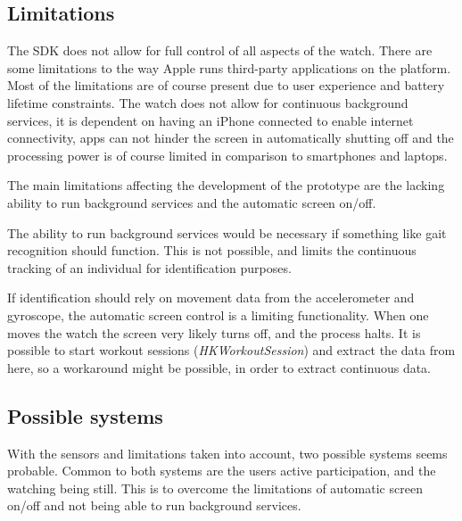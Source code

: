 \subsection{Limitations}
The SDK does not allow for full control of all aspects of the watch. There are
some limitations to the way Apple runs third-party applications on the platform.
Most of the limitations are of course present due to user experience and battery
lifetime constraints. The watch does not allow for continuous background services, it is
dependent on having an iPhone connected to enable internet connectivity, apps can not
hinder the screen in automatically shutting off and the processing power is of
course limited in comparison to smartphones and laptops.

The main limitations affecting the development of the prototype are the lacking
ability to run background services and the automatic screen on/off.

The ability to run background services would be necessary if something like gait
recognition should function. This is not possible, and limits the continuous
tracking of an individual for identification purposes. 

If identification should rely on movement data from the accelerometer and
gyroscope, the automatic screen control is a limiting functionality. When one
moves the watch the screen very likely turns off, and the process halts. It is
possible to start workout sessions (\textit{HKWorkoutSession}) 
\cite{workoutsession} and extract the data from here, so a workaround might be 
possible, in order to extract continuous data.


\subsection{Possible systems}
With the sensors and limitations taken into account, two possible systems seems
probable. Common to both systems are the users active participation, and the
watching being still. This is to overcome the limitations of automatic screen
on/off and not being able to run background services.

